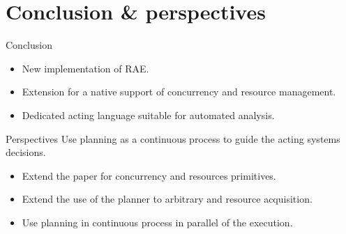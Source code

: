 \section{Conclusion \& perspectives}
\begin{frame}[c]{Conclusion}
    \begin{itemize}
        \item New implementation of RAE.
        \item Extension for a native support of concurrency and resource management.
        \item Dedicated acting language suitable for automated analysis.
    \end{itemize}    
\end{frame}

\begin{frame}[c]{Perspectives}
    Use planning as a continuous process to guide the acting systems decisions.
    \begin{itemize}
    \item Extend the paper \cite{turiGuidanceRefinementbasedActing2022} for concurrency and resources primitives.
    \item Extend the use of the planner to arbitrary and resource acquisition.
    \item Use planning in continuous process in parallel of the execution.
    \end{itemize}
\end{frame}

